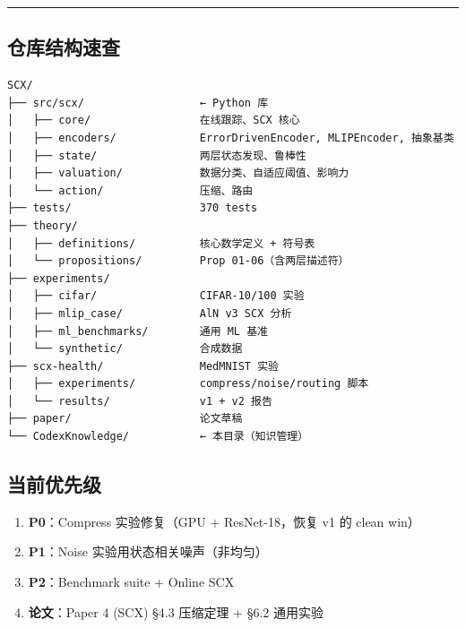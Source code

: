 \documentclass[
  12pt,
]{ctexart}
\providecommand{\tightlist}{%
  \setlength{\itemsep}{0pt}\setlength{\parskip}{0pt}}
\begin{document}
\begin{center}\rule{0.5\linewidth}{0.5pt}\end{center}

\subsection{仓库结构速查}\label{ux4ed3ux5e93ux7ed3ux6784ux901fux67e5}

\begin{verbatim}
SCX/
├── src/scx/                  ← Python 库
│   ├── core/                 在线跟踪、SCX 核心
│   ├── encoders/             ErrorDrivenEncoder, MLIPEncoder, 抽象基类
│   ├── state/                两层状态发现、鲁棒性
│   ├── valuation/            数据分类、自适应阈值、影响力
│   └── action/               压缩、路由
├── tests/                    370 tests
├── theory/
│   ├── definitions/          核心数学定义 + 符号表
│   └── propositions/         Prop 01-06（含两层描述符）
├── experiments/
│   ├── cifar/                CIFAR-10/100 实验
│   ├── mlip_case/            AlN v3 SCX 分析
│   ├── ml_benchmarks/        通用 ML 基准
│   └── synthetic/            合成数据
├── scx-health/               MedMNIST 实验
│   ├── experiments/          compress/noise/routing 脚本
│   └── results/              v1 + v2 报告
├── paper/                    论文草稿
└── CodexKnowledge/           ← 本目录（知识管理）
\end{verbatim}

\subsection{当前优先级}\label{ux5f53ux524dux4f18ux5148ux7ea7}

\begin{enumerate}
\def\labelenumi{\arabic{enumi}.}
\tightlist
\item
  \textbf{P0}：Compress 实验修复（GPU + ResNet-18，恢复 v1 的 clean
  win）
\item
  \textbf{P1}：Noise 实验用状态相关噪声（非均匀）
\item
  \textbf{P2}：Benchmark suite + Online SCX
\item
  \textbf{论文}：Paper 4 (SCX) §4.3 压缩定理 + §6.2 通用实验
\end{enumerate}
\end{document}
